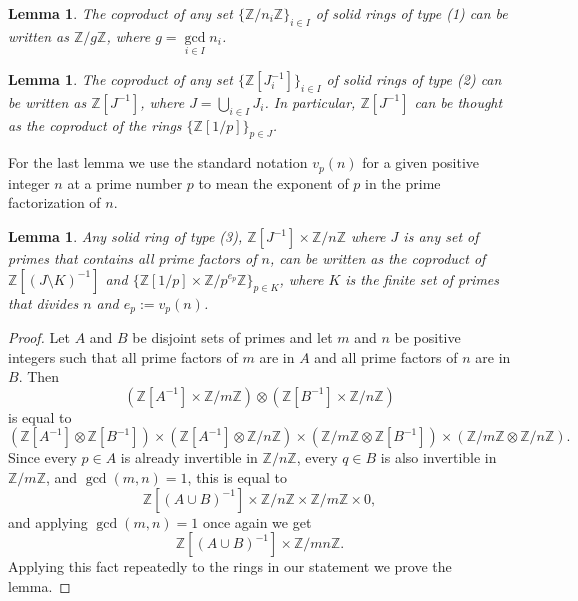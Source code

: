 \documentclass{amsart}
\newtheorem{lemma}[subsection]{Lemma}
\newcommand{\Z}{{\mathbb Z}}
\begin{document}
    \begin{lemma}
    \label{lmm:co_1}
        The coproduct of any set $\{\Z/n_i\Z\}_{i \in I}$ of solid rings of type (1) can be written as $\Z/g\Z$, where $g = \gcd\limits_{i \in I} n_i$.
    \end{lemma}

    \begin{lemma}
    \label{lmm:co_2}
        The coproduct of any set $\{\Z[J_i^{-1}]\}_{i \in I}$ of solid rings of type (2) can be written as $\Z[J^{-1}]$, where $J = \bigcup\limits_{i \in I} J_i$.
        In particular, $\Z[J^{-1}]$ can be thought as the coproduct of the rings $\{\Z[1/p]\}_{p \in J}$.
    \end{lemma}

    For the last lemma we use the standard notation $v_p(n)$ for a given positive integer $n$ at a prime number $p$ to mean the exponent of $p$ in the prime factorization of $n$.

    \begin{lemma}
    \label{lmm:co_3}
    Any solid ring of type (3), $\Z[J^{-1}] \times \Z/n\Z$ where $J$ is any set of primes that contains all prime factors of $n$, can be written as the coproduct of $\Z[(J\setminus K)^{-1}]$ and $\{\Z[1/p] \times \Z/p^{e_p}\Z\}_{p \in K}$, where $K$ is the finite set of primes that divides $n$ and $e_p := v_p(n)$.
    \end{lemma}
    \begin{proof}
        Let $A$ and $B$ be disjoint sets of primes and let $m$ and $n$ be positive integers such that all prime factors of $m$ are in $A$ and all prime factors of $n$ are in $B$.
        Then
        $$
        (\Z[A^{-1}] \times \Z/m\Z) \otimes (\Z[B^{-1}] \times \Z/n\Z)
        $$
        is equal to
        $$
        (\Z[A^{-1}] \otimes \Z[B^{-1}])
        \times (\Z[A^{-1}] \otimes \Z/n\Z)
        \times (\Z/m\Z \otimes \Z[B^{-1}])
        \times (\Z/m\Z \otimes \Z/n\Z).
        $$
        Since every $p \in A$ is already invertible in $\Z/n\Z$, every $q \in B$ is also invertible in $\Z/m\Z$, and $\gcd(m,n) = 1$, this is equal to
        $$
        \Z[(A \cup B)^{-1}]
        \times \Z/n\Z
        \times \Z/m\Z
        \times 0,
        $$
        and applying $\gcd(m,n) = 1$ once again we get
        $$
        \Z[(A \cup B)^{-1}]
        \times \Z/mn\Z.
        $$
        Applying this fact repeatedly to the rings in our statement we prove the lemma.
    \end{proof}
\end{document}
